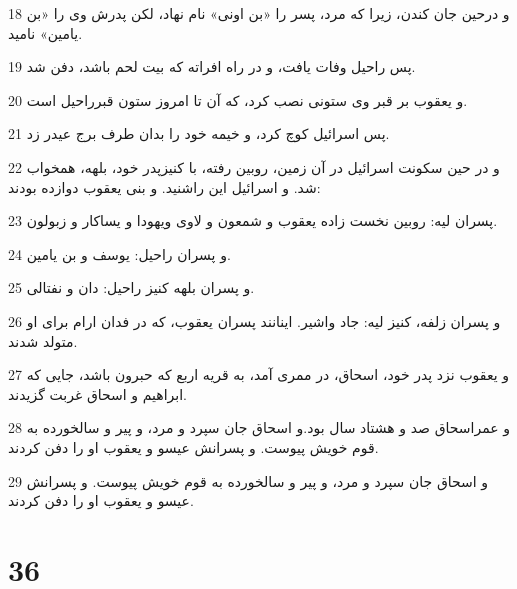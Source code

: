 \par 18 و درحین جان کندن، زیرا که مرد، پسر را «بن اونی» نام نهاد، لکن پدرش وی را «بن یامین» نامید.
\par 19 پس راحیل وفات یافت، و در راه افراته که بیت لحم باشد، دفن شد.
\par 20 و یعقوب بر قبر وی ستونی نصب کرد، که آن تا امروز ستون قبرراحیل است.
\par 21 پس اسرائیل کوچ کرد، و خیمه خود را بدان طرف برج عیدر زد.
\par 22 و در حین سکونت اسرائیل در آن زمین، روبین رفته، با کنیزپدر خود، بلهه، همخواب شد. و اسرائیل این راشنید. و بنی یعقوب دوازده بودند:
\par 23 پسران لیه: روبین نخست زاده یعقوب و شمعون و لاوی ویهودا و یساکار و زبولون.
\par 24 و پسران راحیل: یوسف و بن یامین.
\par 25 و پسران بلهه کنیز راحیل: دان و نفتالی.
\par 26 و پسران زلفه، کنیز لیه: جاد واشیر. اینانند پسران یعقوب، که در فدان ارام برای او متولد شدند.
\par 27 و یعقوب نزد پدر خود، اسحاق، در ممری آمد، به قریه اربع که حبرون باشد، جایی که ابراهیم و اسحاق غربت گزیدند.
\par 28 و عمراسحاق صد و هشتاد سال بود.و اسحاق جان سپرد و مرد، و پیر و سالخورده به قوم خویش پیوست. و پسرانش عیسو و یعقوب او را دفن کردند.
\par 29 و اسحاق جان سپرد و مرد، و پیر و سالخورده به قوم خویش پیوست. و پسرانش عیسو و یعقوب او را دفن کردند.
 
\chapter{36}

